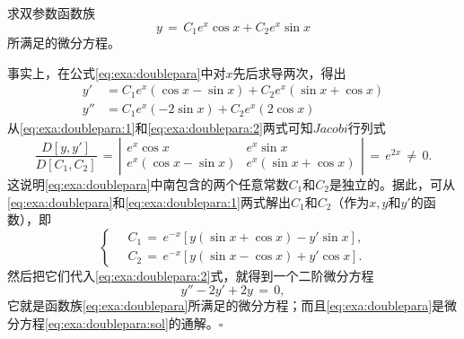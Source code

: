 \begin{example}
求双参数函数族
\begin{equation}\label{eq:exa:doublepara}
y\,=\,C_1e^x\cos x+C_2e^x\sin x
\end{equation}
所满足的微分方程。
\end{example}
事实上，在公式\eqref{eq:exa:doublepara}中对$x$先后求导两次，得出
\begin{align}
y' &= C_1e^x(\cos x-\sin x)+C_2e^x(\sin x+\cos x)\label{eq:exa:doublepara:1} \\
y''&= C_1e^x(-2\sin x)+C_2e^x(2\cos x)\label{eq:exa:doublepara:2}
\end{align}
从\eqref{eq:exa:doublepara:1}和\eqref{eq:exa:doublepara:2}两式可知$Jacobi$行列式
$$
\frac{D\left[y,y'\right]}{D\left[C_1,C_2\right]}\,=\,
\left|
\begin{matrix}
e^x\cos x & e^x\sin x \\
e^x(\cos x-\sin x) & e^x(\sin x+\cos x)
\end{matrix}
\right|
\,=\,e^{2x}\,\neq\,0.
$$
这说明\eqref{eq:exa:doublepara}中南包含的两个任意常数$C_1$和$C_2$是独立的。据此，可从\eqref{eq:exa:doublepara}和\eqref{eq:exa:doublepara:1}两式解出$C_1$和$C_2$（作为$x,y$和$y'$的函数），即
\begin{equation*}
    \begin{cases}
        \quad C_1\,=\,e^{-x}[y(\sin x+\cos x)-y'\sin x], \\
        \quad C_2\,=\,e^{-x}[y(\sin x-\cos x)+y'\cos x].        
    \end{cases}
\end{equation*}
然后把它们代入\eqref{eq:exa:doublepara:2}式，就得到一个二阶微分方程
\begin{equation}\label{eq:exa:doublepara:sol}
y''-2y'+2y\,=\,0,
\end{equation}
它就是函数族\eqref{eq:exa:doublepara}所满足的微分方程；而且\eqref{eq:exa:doublepara}是微分方程\eqref{eq:exa:doublepara:sol}的通解。\hfill$\square$
